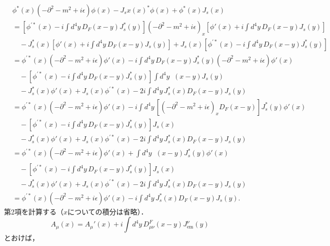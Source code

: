 \begin{align*}
  & \phi^\ast(x) (-\partial^2 - m^2 + i\epsilon) \phi(x) - J_sx(x)^\ast \phi(x) + \phi^\ast(x) J_s(x) \\
  &= \left[ \phi^{\prime\ast}(x) - i \int d^4 y \, D_F(x-y) J_s^\ast(y) \right]
  (-\partial^2 - m^2 + i\epsilon)_x \left[ \phi'(x) + i \int d^4 y \, D_F(x-y) J_s(y) \right] \\
  & \quad - J_s^\ast (x) \left[ \phi'(x) + i \int d^4 y \, D_F(x-y) J_s(y) \right]
  + J_s (x) \left[ \phi^{\prime\ast}(x) - i \int d^4 y \, D_F(x-y) J_s^\ast(y) \right] \\
  &= \phi^{\prime\ast}(x) (-\partial^2 - m^2 + i\epsilon) \phi'(x)
  - i \int d^4 y \, D_F(x-y) J_s^\ast(y) (-\partial^2 - m^2 + i\epsilon) \phi'(x) \\
  & \quad - \left[ \phi^{\prime\ast}(x) - i \int d^4 y \, D_F(x-y) J_s^\ast(y) \right] \int d^4 y \mathop{\delta^{(4)}}(x-y) J_s(y) \\
  & \quad - J_s^\ast(x) \phi'(x) + J_s(x) \phi^{\prime\ast}(x) - 2 i \int d^4 y \, J_s^\ast(x) D_F(x-y) J_s(y) \\
  &= \phi^{\prime\ast}(x) (-\partial^2 - m^2 + i\epsilon) \phi'(x)
  - i \int d^4 y \, \left[ (-\partial^2 - m^2 + i\epsilon)_x D_F(x-y) \right] J_s^\ast(y) \phi'(x) \\
  & \quad - \left[ \phi^{\prime\ast}(x) - i \int d^4 y \, D_F(x-y) J_s^\ast(y) \right] J_s(x) \\
  & \quad - J_s^\ast(x) \phi'(x) + J_s(x) \phi^{\prime\ast}(x) - 2 i \int d^4 y \, J_s^\ast(x) D_F(x-y) J_s(y) \\
  &= \phi^{\prime\ast}(x) (-\partial^2 - m^2 + i\epsilon) \phi'(x)
  + \int d^4 y \mathop{\delta^{(4)}}(x-y) J_s^\ast(y) \phi'(x) \\
  & \quad - \left[ \phi^{\prime\ast}(x) - i \int d^4 y \, D_F(x-y) J_s^\ast(y) \right] J_s(x) \\
  & \quad - J_s^\ast(x) \phi'(x) + J_s(x) \phi^{\prime\ast}(x) - 2 i \int d^4 y \, J_s^\ast(x) D_F(x-y) J_s(y) \\
  &= \phi^{\prime\ast}(x) (-\partial^2 - m^2 + i\epsilon) \phi'(x) - i \int d^4 y \, J_s^\ast(x) D_F(x-y) J_s(y) .
\end{align*}
第2項を計算する（$x$についての積分は省略）．
\[ A_\mu(x) = A_\mu'(x) + i \int d^4y \, D_{\mu\nu}^F (x-y) J_\text{em}^\nu (y) \]
とおけば，
